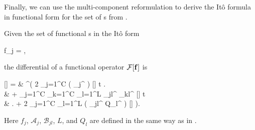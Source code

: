 Finally, we can use the multi-component reformulation to derive the It\^o formula in functional form for the set of s from .

\begin{theorem}
\label{thm:fpe-sde:ito-formula:func-ito-f}
	Given the set of functional s in the It\^o form
	\begin{eqn*}
		\upd f_j =  \left[
			\mathcal{A}_j \upd t + \sum_{l=1}^L \mathcal{B}_{jl} \upd Q_l
		\right],
	\end{eqn*}
	the differential of a functional operator $\mathcal{F}[\mathbf{f}]$ is
	\begin{eqn*}
		\upd {}[\fvec]
		={} & \int \upd\xvec^\prime \left(
			2 \sum_{j=1}^C \Real \left(
				_j^\prime \frac{\fdelta}{\fdelta f_j^\prime}
			\right) [\fvec] \upd t \right. \\
		& + \sum_{j=1}^C \sum_{k=1}^C \sum_{l=1}^L
				_{jl}^\prime
				_{kl}^{\prime *}
				\frac{\fdelta}{\fdelta f_j^\prime}
				 [\fvec] \upd t \\
		& \left. + 2 \sum_{j=1}^C \sum_{l=1}^L
			\Real \left(
				_{jl}^\prime
				\upd Q_l^\prime
				\frac{\fdelta}{\fdelta f_j^\prime}
			\right)
			\mathcal{F}[\fvec]
		\right).
	\end{eqn*}
	Here $f_j$, $\mathcal{A}_j$, $\mathcal{B}_{jl}$, $L$, and $Q_l$ are defined in the same way as in .
\end{theorem}
